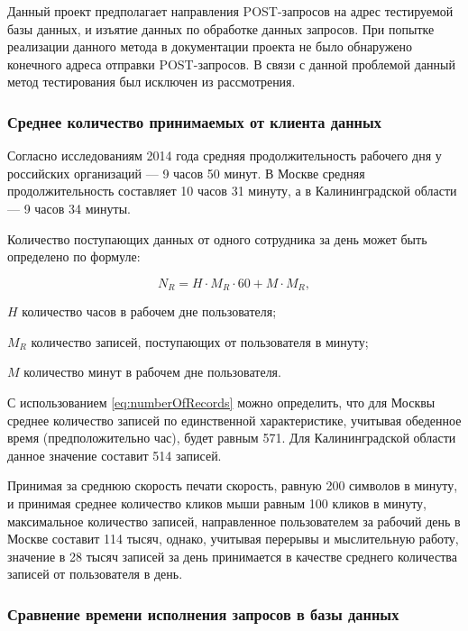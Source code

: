 Данный проект предполагает направления POST-запросов на адрес тестируемой базы данных, и изъятие данных по обработке данных запросов. При попытке реализации данного метода в документации проекта не было обнаружено конечного адреса отправки POST-запросов. В связи с данной проблемой данный метод тестирования был исключен из рассмотрения.

\subsubsection{Среднее количество принимаемых от клиента данных}

Согласно исследованиям 2014 года средняя продолжительность рабочего дня у российских организаций --- 9 часов 50 минут. В Москве средняя продолжительность составляет 10 часов 31 минуту, а в Калининградской области --- 9 часов 34 минуты. \cite{yandRes}

Количество поступающих данных от одного сотрудника за день может быть определено по формуле:

\begin{equation}
\label{eq:numberOfRecords}
N_R = H \cdot M_R \cdot 60 + M \cdot M_R,
\end{equation}
\begin{eqexpl}[15mm]
\item{$H$} количество часов в рабочем дне пользователя;
\item{$M_R$} количество записей, поступающих от пользователя в минуту;
\item{$M$} количество минут в рабочем дне пользователя.
\end{eqexpl}

С использованием \eqref{eq:numberOfRecords} можно определить, что для Москвы среднее количество записей по единственной характеристике, учитывая обеденное время (предположительно час), будет равным 571. Для Калининградской области данное значение составит 514 записей.

Принимая за среднюю скорость печати скорость, равную 200 символов в минуту, и принимая среднее количество кликов мыши равным 100 кликов в минуту, максимальное количество записей, направленное пользователем за рабочий день в Москве составит 114 тысяч, однако, учитывая перерывы и мыслительную работу, значение в 28 тысяч записей за день принимается в качестве среднего количества записей от пользователя в день.

\subsubsection{Сравнение времени исполнения запросов в базы данных}

